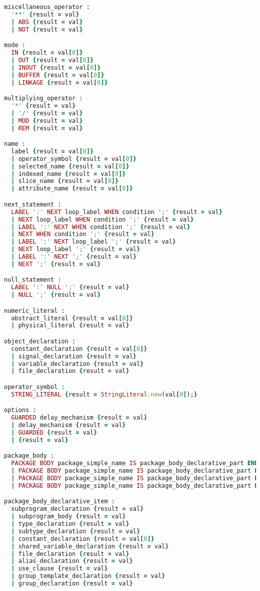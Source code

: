 \begin{lstlisting}[language=Ruby, style=rubystyle]
miscellaneous_operator :
  '**' {result = val}
  | ABS {result = val}
  | NOT {result = val}

mode :
  IN {result = val[0]}
  | OUT {result = val[0]}
  | INOUT {result = val[0]}
  | BUFFER {result = val[0]}
  | LINKAGE {result = val[0]}

multiplying_operator :
  '*' {result = val}
  | '/' {result = val}
  | MOD {result = val}
  | REM {result = val}

name :
  label {result = val[0]}
  | operator_symbol {result = val[0]}
  | selected_name {result = val[0]}
  | indexed_name {result = val[0]}
  | slice_name {result = val[0]}
  | attribute_name {result = val[0]}

next_statement :
  LABEL ':' NEXT loop_label WHEN condition ';' {result = val}
  | NEXT loop_label WHEN condition ';' {result = val}
  | LABEL ':' NEXT WHEN condition ';' {result = val}
  | NEXT WHEN condition ';' {result = val}
  | LABEL ':' NEXT loop_label ';' {result = val}
  | NEXT loop_label ';' {result = val}
  | LABEL ':' NEXT ';' {result = val}
  | NEXT ';' {result = val}

null_statement :
  LABEL ':' NULL ';' {result = val}
  | NULL ';' {result = val}

numeric_literal :
  abstract_literal {result = val[0]}
  | physical_literal {result = val}

object_declaration :
  constant_declaration {result = val[0]}
  | signal_declaration {result = val}
  | variable_declaration {result = val}
  | file_declaration {result = val}

operator_symbol :
  STRING_LITERAL {result = StringLiteral.new(val[0]);}

options :
  GUARDED delay_mechanism {result = val}
  | delay_mechanism {result = val}
  | GUARDED {result = val}
  | {result = val}

package_body :
  PACKAGE BODY package_simple_name IS package_body_declarative_part END PACKAGE BODY package_simple_name ';' {result = val}
  | PACKAGE BODY package_simple_name IS package_body_declarative_part END package_simple_name ';' {result = val}
  | PACKAGE BODY package_simple_name IS package_body_declarative_part END PACKAGE BODY ';' {result = val}
  | PACKAGE BODY package_simple_name IS package_body_declarative_part END ';' {result = val}

package_body_declarative_item :
  subprogram_declaration {result = val}
  | subprogram_body {result = val}
  | type_declaration {result = val}
  | subtype_declaration {result = val}
  | constant_declaration {result = val[0]}
  | shared_variable_declaration {result = val}
  | file_declaration {result = val}
  | alias_declaration {result = val}
  | use_clause {result = val}
  | group_template_declaration {result = val}
  | group_declaration {result = val}


\end{lstlisting}
